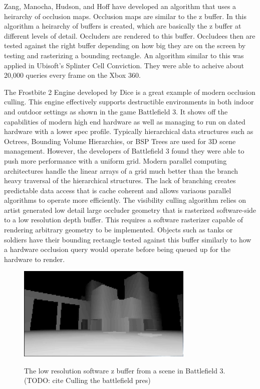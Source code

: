 \documentclass[12pt]{ucthesis}
\newcommand{\captionfonts}{\small\bf\ssp}
\begin{document}
Zang, Manocha, Hudson, and Hoff have developed an algorithm that uses a heirarchy of occlusion maps.\cite{heir-occ-map}
Occlusion maps are similar to the z buffer.
In this algorithm a heirarchy of buffers is created, which are basically the z buffer at different levels of detail.
Occluders are rendered to this buffer.
Occludees then are tested against the right buffer depending on how big they are on the screen by testing and rasterizing a bounding rectangle.
An algorithm similar to this was applied in Ubisoft's Splinter Cell Conviction.\cite{spliter}
They were able to acheive about 20,000 queries every frame on the Xbox 360.

The Frostbite 2 Engine developed by Dice is a great example of modern occlusion culling.\cite{culling-bf}
This engine effectively supports destructible environments in both indoor and outdoor settings as shown in the game Battlefield 3.
It shows off the capabilities of modern high end hardware as well as managing to run on dated hardware with a lower spec profile.
Typically hierarchical data structures such as Octrees, Bounding Volume Hierarchies, or BSP Trees are used for 3D scene management.\cite{CHC, CHCpp, GpuGem-Queries, dpvs}
However, the developers of Battlefield 3 found they were able to push more performance with a uniform grid.
Modern parallel computing architectures handle the linear arrays of a grid much better than the branch heavy traversal of the hierarchical structures.\cite{culling-bf}
The lack of branching creates predictable data access that is cache coherent and allows variaous parallel algorithms to operate more efficiently.
The visibility culling algorithm relies on artist generated low detail large occluder geometry that is rasterized software-side to a low resolution depth buffer.
This requires a software rasterizer capable of rendering arbitrary geometry to be implemented.
Objects such as tanks or soldiers have their bounding rectangle tested against this buffer similarly to how a hardware occlusion query would operate before being queued up for the hardware to render.

\begin{figure}
\begin{center}
\includegraphics[width=0.75\textwidth]{Images/Bf3Buffer.jpg}
\captionfonts
\caption[Software Z Buffer Buffer]{The low resolution software z buffer from a scene in Battlefield 3. (TODO: cite Culling the battlefield pres)}
\label{fig:softare-z}
\end{center}
\end{figure}
\end{document}
